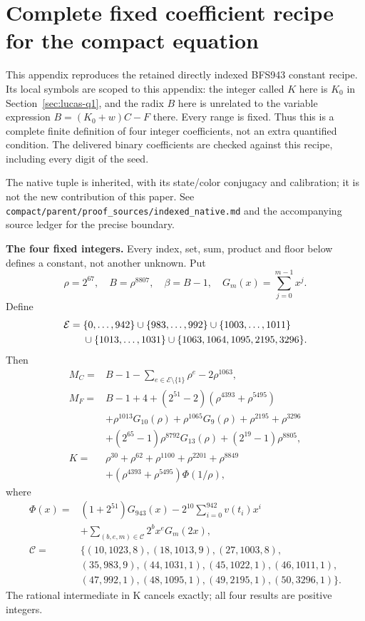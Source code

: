 \section{Complete fixed coefficient recipe for the compact equation}
\label{app:constants}
This appendix reproduces the retained directly indexed BFS943 constant recipe.
Its local symbols are scoped to this appendix: the integer called $K$ here is
$K_0$ in Section~\ref{sec:lucas-q1}, and the radix $B$ here is unrelated to
the variable expression $B=(K_0+w)C-F$ there.  Every range is fixed.  Thus
this is a complete finite definition of four integer coefficients, not an
extra quantified condition.  The delivered binary coefficients are checked
against this recipe, including every digit of the seed.

The native tuple is inherited, with its state/color conjugacy and calibration;
it is not the new contribution of this paper.  See
\texttt{compact/parent/proof\_sources/indexed\_native.md} and the accompanying
source ledger for the precise boundary.

\textbf{The four fixed integers.}
Every index, set, sum, product and floor below defines a constant, not
another unknown. Put
\[
\rho=2^{67},\quad B=\rho^{8807},\quad\beta=B-1,\quad
G_m(x)=\sum_{j=0}^{m-1}x^j.
\]
Define
\[
\begin{split}
\mathcal E={}&\{0,\ldots,942\}\cup\{983,\ldots,992\}\cup\{1003,\ldots,1011\}\\
&\cup\{1013,\ldots,1031\}\cup\{1063,1064,1095,2195,3296\}.
\end{split}
\]
Then
\begin{align*}
M_C={}&B-1-\sum_{e\in\mathcal E\setminus\{1\}}\rho^e-2\rho^{1063},\\
M_F={}&B-1+4+(2^{51}-2)(\rho^{4393}+\rho^{5495})\\
&+\rho^{1013}G_{10}(\rho)+\rho^{1065}G_9(\rho)
  +\rho^{2195}+\rho^{3296}\\
&+(2^{65}-1)\rho^{8792}G_{13}(\rho)+(2^{19}-1)\rho^{8805},\\
K={}&\rho^{30}+\rho^{62}+\rho^{1100}+\rho^{2201}+\rho^{8849}\\
&+(\rho^{4393}+\rho^{5495})\Phi(1/\rho),
\end{align*}
where
\[
\begin{split}
\Phi(x)={}&(1+2^{51})G_{943}(x)
 -2^{10}\sum_{i=0}^{942}v(t_i)x^i\\
&+\sum_{(b,e,m)\in\mathcal C}2^b x^e G_m(2x),\\
\mathcal C={}&\{(10,1023,8),(18,1013,9),(27,1003,8),\\
&(35,983,9),(44,1031,1),(45,1022,1),(46,1011,1),\\
&(47,992,1),(48,1095,1),(49,2195,1),(50,3296,1)\}.
\end{split}
\]
The rational intermediate in K cancels exactly; all four results are positive integers.

